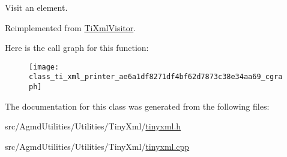 Visit an element. 



Reimplemented from \hyperlink{class_ti_xml_visitor_aec2b1f8116226d52f3a1b95dafd3a32c}{Ti\+Xml\+Visitor}.



Here is the call graph for this function\+:\nopagebreak
\begin{figure}[H]
\begin{center}
\leavevmode
\texttt{[image: class\_ti\_xml\_printer\_ae6a1df8271df4bf62d7873c38e34aa69\_cgraph]}
\end{center}
\end{figure}




The documentation for this class was generated from the following files\+:\begin{DoxyCompactItemize}
\item 
src/\+Agmd\+Utilities/\+Utilities/\+Tiny\+Xml/\hyperlink{tinyxml_8h}{tinyxml.\+h}\item 
src/\+Agmd\+Utilities/\+Utilities/\+Tiny\+Xml/\hyperlink{tinyxml_8cpp}{tinyxml.\+cpp}\end{DoxyCompactItemize}
